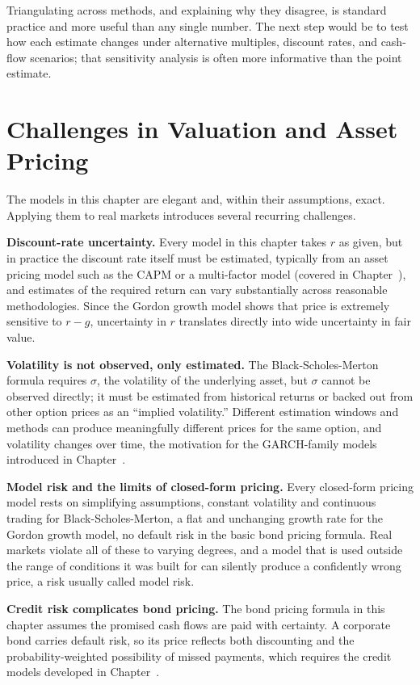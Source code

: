 \documentclass[../ai_in_finance]{subfiles}
\begin{document}
Triangulating across methods, and explaining why they disagree, is standard practice and more useful than any single number. The next step would be to test how each estimate changes under alternative multiples, discount rates, and cash-flow scenarios; that sensitivity analysis is often more informative than the point estimate.

\section{Challenges in Valuation and Asset Pricing}
\label{sec:valuation-challenges}

The models in this chapter are elegant and, within their assumptions, exact. Applying them to real markets introduces several recurring challenges.

\textbf{Discount-rate uncertainty.} Every model in this chapter takes $r$ as given, but in practice the discount rate itself must be estimated, typically from an asset pricing model such as the CAPM or a multi-factor model (covered in Chapter~), and estimates of the required return can vary substantially across reasonable methodologies. Since the Gordon growth model shows that price is extremely sensitive to $r-g$, uncertainty in $r$ translates directly into wide uncertainty in fair value.

\textbf{Volatility is not observed, only estimated.} The Black-Scholes-Merton formula requires $\sigma$, the volatility of the underlying asset, but $\sigma$ cannot be observed directly; it must be estimated from historical returns or backed out from other option prices as an ``implied volatility.'' Different estimation windows and methods can produce meaningfully different prices for the same option, and volatility changes over time, the motivation for the GARCH-family models introduced in Chapter~.

\textbf{Model risk and the limits of closed-form pricing.} Every closed-form pricing model rests on simplifying assumptions, constant volatility and continuous trading for Black-Scholes-Merton, a flat and unchanging growth rate for the Gordon growth model, no default risk in the basic bond pricing formula. Real markets violate all of these to varying degrees, and a model that is used outside the range of conditions it was built for can silently produce a confidently wrong price, a risk usually called model risk.

\textbf{Credit risk complicates bond pricing.} The bond pricing formula in this chapter assumes the promised cash flows are paid with certainty. A corporate bond carries default risk, so its price reflects both discounting and the probability-weighted possibility of missed payments, which requires the credit models developed in Chapter~.
\end{document}
